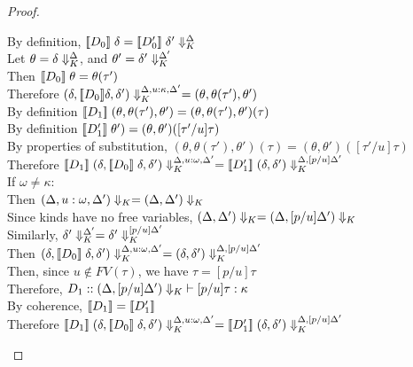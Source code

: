 \begin{proof}
\begin{enumerate}
\begin{itemize}
\begin{tabbedproof}
      \oooo By definition, $\interp{D_0}\;\delta = \interp{D'_0}\;\restricttyenv{\Delta}{\delta'}$\\
      \oooo Let $\theta = \restricttyenv{\Delta}{\delta}$, and
                $\theta' = \restricttyenv{\Delta'}{\delta'}$ \\
      \oooo Then $\interp{D_0}\;\theta = \theta(\tau')$ \\
      \oooo Therefore $\restricttyenv{\Delta, u:\kappa, \Delta'}{(\delta, \interp{D_0}\delta, \delta')} = 
                       (\theta, \theta(\tau'), \theta')$ \\
      \oooo By definition $\interp{D_1}\;(\theta, \theta(\tau'), \theta') = (\theta, \theta(\tau'), \theta')(\tau)$ \\
      \oooo By definition $\interp{D'_1}\;\theta') = (\theta, \theta')([\tau'/u]\tau)$ \\
      \oooo By properties of substitution, $(\theta, \theta(\tau'), \theta')(\tau) = (\theta, \theta')([\tau'/u]\tau)$ \\
      \oooo Therefore 
            $\interp{D_1}\;\restricttyenv{\Delta, u:\omega, \Delta'}{(\delta, \interp{D_0}\;\delta, \delta')} = \interp{D'_1}\;\restricttyenv{\Delta, [p/u]\Delta'}{(\delta, \delta')}$ \\
      \ooo If $\omega \not= \kappa$: \\
      \oooo Then $\restrictkind{\Delta, u:\omega, \Delta'} = \restrictkind{\Delta, \Delta'}$ \\
      \oooo Since kinds have no free variables, $\restrictkind{\Delta, \Delta'} = 
                                                 \restrictkind{\Delta, [p/u]\Delta'}$ \\
      \oooo Similarly, $\restricttyenv{\Delta'}{\delta'} = \restricttyenv{[p/u]\Delta'}{\delta'}$\\
      \oooo Then $\restricttyenv{\Delta, u:\omega, \Delta'}{(\delta, \interp{D_0}\;\delta, \delta')}
                 =\restricttyenv{\Delta, [p/u]\Delta'}{(\delta, \delta')}$ \\
      \oooo Then, since $u \not\in FV(\tau)$, we have $\tau = [p/u]\tau$ \\
      \oooo Therefore, $D_1 :: \judgeWK[\restrictkind{\Delta, [p/u]\Delta'}]{[p/u]\tau}{\kappa}$ \\
      \oooo By coherence, $\interp{D_1} = \interp{D'_1}$ \\
      \oooo Therefore 
            $\interp{D_1}\;\restricttyenv{\Delta, u:\omega, \Delta'}{(\delta, \interp{D_0}\;\delta, \delta')} = \interp{D'_1}\;\restricttyenv{\Delta, [p/u]\Delta'}{(\delta, \delta')}$ \\
    \end{tabbedproof}



\end{itemize}
\end{enumerate}
\end{proof}
